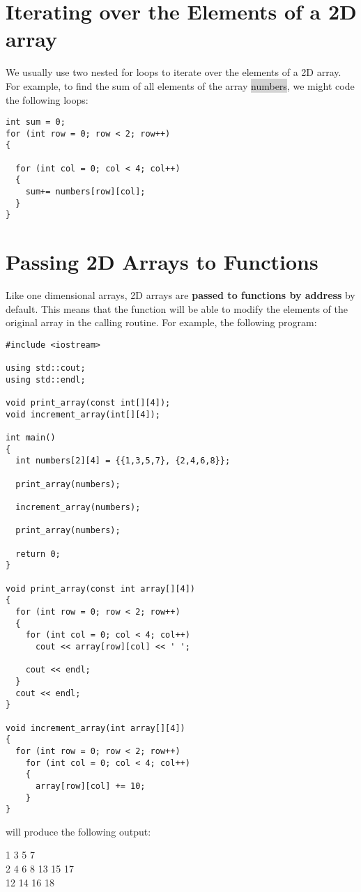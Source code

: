 \documentclass{report}
\begin{document}
\section{Iterating over the Elements of a 2D array}
We usually use two nested for loops to iterate over the elements of a 2D array. For example, to find the sum of all elements of the array \colorbox{lightgray}{numbers}, we might code the following loops:
\begin{mdframed}
\begin{verbatim}
int sum = 0;
for (int row = 0; row < 2; row++)
{

  for (int col = 0; col < 4; col++)
  {
    sum+= numbers[row][col];
  }
}
\end{verbatim}
\end{mdframed}
\section{Passing 2D Arrays to Functions}
Like one dimensional arrays, 2D arrays are \textbf{passed to functions by address} by default. This means that the function will be able to modify the elements of the original array in the calling routine. For example, the following program:
\begin{mdframed}
\begin{verbatim}
#include <iostream>

using std::cout;
using std::endl;

void print_array(const int[][4]);
void increment_array(int[][4]);

int main()
{
  int numbers[2][4] = {{1,3,5,7}, {2,4,6,8}};

  print_array(numbers);

  increment_array(numbers);

  print_array(numbers);

  return 0;
}

void print_array(const int array[][4])
{
  for (int row = 0; row < 2; row++)
  {
    for (int col = 0; col < 4; col++)
      cout << array[row][col] << ' ';

    cout << endl;
  }
  cout << endl;
}

void increment_array(int array[][4])
{
  for (int row = 0; row < 2; row++)
    for (int col = 0; col < 4; col++)
    {
      array[row][col] += 10;
    }
}
\end{verbatim}
\end{mdframed}
will produce the following output:
\begin{mdframed}
  1 3 5 7 \\ 2 4 6 8
  \bigbreak {} 13 15 17 \\ 12 14 16 18
  
\end{mdframed}
\end{document}
